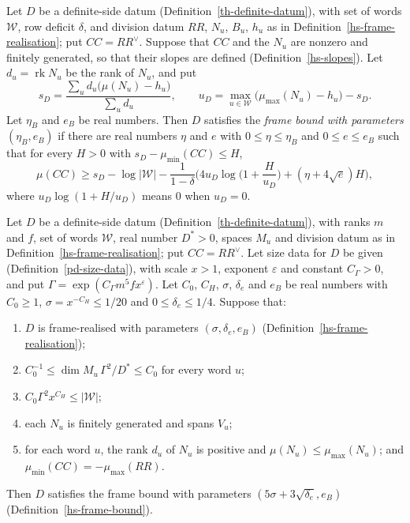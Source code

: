 \begin{definition}\label{hs-frame-bound}
Let $D$ be a definite-side datum (Definition~\ref{th-definite-datum}), with set of words
$\mathcal W$, row deficit $\delta$, and division datum $RR$, $N_u$, $B_u$, $h_u$ as in
Definition~\ref{hs-frame-realisation}; put $CC=RR^\vee$. Suppose that $CC$ and the $N_u$ are
nonzero and finitely generated, so that their slopes are defined (Definition~\ref{hs-slopes}).
Let $d_u=\operatorname{rk}N_u$ be the rank of $N_u$, and put
\[
 s_D=\frac{\sum_ud_u\big(\mu(N_u)-h_u\big)}{\sum_ud_u},
 \qquad
 u_D=\max_{u\in\mathcal W}\big(\mu_{\max}(N_u)-h_u\big)-s_D .
\]
Let $\eta_B$ and $e_B$ be real numbers. Then $D$ satisfies the \emph{frame bound with parameters
$(\eta_B,e_B)$} if there are real numbers $\eta$ and $e$ with $0\leq\eta\leq\eta_B$ and
$0\leq e\leq e_B$ such that for every $H>0$ with $s_D-\mu_{\min}(CC)\leq H$,
\[
 \mu(CC)\geq s_D-\log|\mathcal W|-\frac1{1-\delta}
 \Big(4u_D\log\Big(1+\frac H{u_D}\Big)+(\eta+4\sqrt e)H\Big),
\]
where $u_D\log(1+H/u_D)$ means $0$ when $u_D=0$.
\end{definition}

\begin{proposition}\label{hs-frame-at-glued-lattice}
Let $D$ be a definite-side datum (Definition~\ref{th-definite-datum}), with ranks $m$ and $f$,
set of words $\mathcal W$, real number $D^*>0$, spaces $M_u$ and division datum as in
Definition~\ref{hs-frame-realisation}; put $CC=RR^\vee$. Let size data for $D$ be given
(Definition~\ref{pd-size-data}), with scale $x>1$, exponent $\varepsilon$ and constant
$C_\Gamma>0$, and put $\Gamma=\exp(C_\Gamma m^5fx^{\varepsilon})$.
Let $C_0$, $C_H$, $\sigma$, $\delta_e$ and $e_B$ be real numbers with $C_0\geq1$,
$\sigma=x^{-C_H}\leq1/20$ and $0\leq\delta_e\leq1/4$. Suppose that:
\begin{enumerate}
\item $D$ is frame-realised with parameters $(\sigma,\delta_e,e_B)$
  (Definition~\ref{hs-frame-realisation});
\item $C_0^{-1}\leq\dim M_u\,\Gamma^2/D^*\leq C_0$ for every word $u$;
\item $C_0\Gamma^2x^{C_H}\leq|\mathcal W|$;
\item each $N_u$ is finitely generated and spans $V_u$;
\item for each word $u$, the rank $d_u$ of $N_u$ is positive and $\mu(N_u)\leq\mu_{\max}(N_u)$; and
  $\mu_{\min}(CC)=-\mu_{\max}(RR)$.
\end{enumerate}
Then $D$ satisfies the frame bound with parameters $(5\sigma+3\sqrt{\delta_e},e_B)$
(Definition~\ref{hs-frame-bound}).
\end{proposition}


